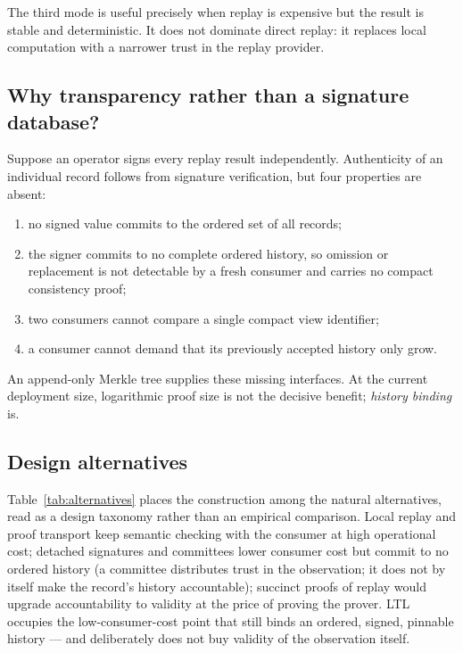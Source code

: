 \documentclass[11pt]{article}
\theoremstyle{remark}
\begin{document}
The third mode is useful precisely when replay is expensive but the result is
stable and deterministic. It does not dominate direct replay: it replaces
local computation with a narrower trust in the replay provider.

\subsection{Why transparency rather than a signature database?}

Suppose an operator signs every replay result independently. Authenticity of
an individual record follows from signature verification, but four properties
are absent:
\begin{enumerate}[leftmargin=1.7em,itemsep=2pt]
\item no signed value commits to the ordered set of all records;
\item the signer commits to no complete ordered history, so omission or
replacement is not detectable by a fresh consumer and carries no compact
consistency proof;
\item two consumers cannot compare a single compact view identifier;
\item a consumer cannot demand that its previously accepted history only grow.
\end{enumerate}
An append-only Merkle tree supplies these missing interfaces. At the current
deployment size, logarithmic proof size is not the decisive benefit;
\emph{history binding} is.

\subsection{Design alternatives}

Table~\ref{tab:alternatives} places the construction among the natural
alternatives, read as a design taxonomy rather than an empirical comparison.
Local replay and proof transport keep semantic checking with the consumer at
high operational cost; detached signatures and committees lower consumer cost
but commit to no ordered history (a committee distributes trust in the
observation; it does not by itself make the record's history accountable);
succinct proofs of replay would upgrade accountability to validity at the
price of proving the prover. LTL occupies the low-consumer-cost point that
still binds an ordered, signed, pinnable history --- and deliberately does not
buy validity of the observation itself.
\end{document}
